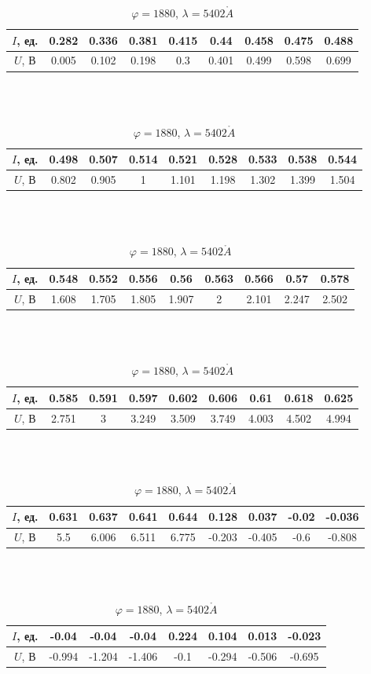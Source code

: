 \documentclass[a4paper, 12pt]{article}
\renewcommand{\phi}{\varphi}
\renewcommand{\AA}{\ensuremath{\mathring{A}}}
\begin{document}
\begin{table}[!h]
    \centering
    \begin{tabular}{|c|c|c|c|c|c|c|c|c|}
        \hline
        $I$, ед. & 0.282 & 0.336 & 0.381 & 0.415 & 0.44 & 0.458 & 0.475 & 0.488\\ \hline
        $U$, В   & 0.005 & 0.102 & 0.198 & 0.3 & 0.401 & 0.499 & 0.598 & 0.699
        \\ \hline
    \end{tabular}
    \\~\\
    \begin{tabular}{|c|c|c|c|c|c|c|c|c|}
        \hline
        $I$, ед. & 0.498 & 0.507 & 0.514 & 0.521 & 0.528 & 0.533 & 0.538 & 0.544\\ \hline
        $U$, В   & 0.802 & 0.905 & 1 & 1.101 & 1.198 & 1.302 & 1.399 & 1.504
        \\ \hline
    \end{tabular}
    \\~\\
    \begin{tabular}{|c|c|c|c|c|c|c|c|c|}
        \hline
        $I$, ед. & 0.548 & 0.552 & 0.556 & 0.56 & 0.563 & 0.566 & 0.57 & 0.578\\ \hline
        $U$, В   & 1.608 & 1.705 & 1.805 & 1.907 & 2 & 2.101 & 2.247 & 2.502
        \\ \hline
    \end{tabular}
    \\~\\
    \begin{tabular}{|c|c|c|c|c|c|c|c|c|}
        \hline
        $I$, ед. & 0.585 & 0.591 & 0.597 & 0.602 & 0.606 & 0.61 & 0.618 & 0.625\\ \hline
        $U$, В   & 2.751 & 3 & 3.249 & 3.509 & 3.749 & 4.003 & 4.502 & 4.994
        \\ \hline
    \end{tabular}
    \\~\\
    \begin{tabular}{|c|c|c|c|c|c|c|c|c|}
        \hline
        $I$, ед. & 0.631 & 0.637 & 0.641 & 0.644 & 0.128 & 0.037 & -0.02 & -0.036\\ \hline
        $U$, В   & 5.5 & 6.006 & 6.511 & 6.775 & -0.203 & -0.405 & -0.6 & -0.808
        \\ \hline
    \end{tabular}
    \\~\\
    \begin{tabular}{|c|c|c|c|c|c|c|c|}
        \hline
        $I$, ед. & -0.04 & -0.04 & -0.04 & 0.224 & 0.104 & 0.013 & -0.023\\ \hline
        $U$, В   & -0.994 & -1.204 & -1.406 & -0.1 & -0.294 & -0.506 & -0.695
        \\ \hline
    \end{tabular}
    \caption {$\phi = 1880$, $\lambda = 5402 \AA$}
\end{table}
\end{document}
